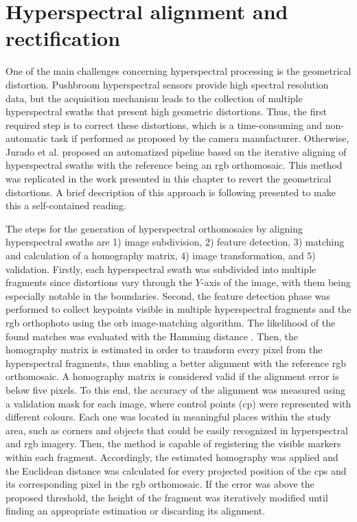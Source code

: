 \section{Hyperspectral alignment and rectification}

One of the main challenges concerning hyperspectral processing is the geometrical distortion. Pushbroom hyperspectral sensors provide high spectral resolution data, but the acquisition mechanism leads to the collection of multiple hyperspectral swaths that present high geometric distortions. Thus, the first required step is to correct these distortions, which is a time-consuming and non-automatic task if performed as proposed by the camera manufacturer. Otherwise, Jurado et al. \cite{jurado_efficient_2021} proposed an automatized pipeline based on the iterative aligning of hyperspectral swaths with the reference being an \acrshort{rgb} orthomosaic. This method was replicated in the work presented in this chapter to revert the geometrical distortions. A brief description of this approach is following presented to make this a self-contained reading.

The steps for the generation of hyperspectral orthomosaics by aligning hyperspectral swaths are 1) image subdivision, 2) feature detection, 3) matching and calculation of a homography matrix, 4) image transformation, and 5) validation. Firstly, each hyperspectral swath was subdivided into multiple fragments since distortions vary through the $Y$-axis of the image, with them being especially notable in the boundaries. Second, the feature detection phase was performed to collect keypoints visible in multiple hyperspectral fragments and the \acrshort{rgb} orthophoto using the \acrshort{orb} image-matching algorithm. The likelihood of the found matches was evaluated with the Hamming distance \cite{norouzi_hamming_2012}. Then, the homography matrix is estimated in order to transform every pixel from the hyperspectral fragments, thus enabling a better alignment with the reference \acrshort{rgb} orthomosaic. A homography matrix is considered valid if the alignment error is below five pixels. To this end, the accuracy of the alignment was measured using a validation mask for each image, where control points (\acrshort{cp}) were represented with different colours. Each one was located in meaningful places within the study area, such as corners and objects that could be easily recognized in hyperspectral and \acrshort{rgb} imagery. Then, the method is capable of registering the visible markers within each fragment. Accordingly, the estimated homography was applied and the Euclidean distance was calculated for every projected position of the \acrshort{cp}s and its corresponding pixel in the \acrshort{rgb} orthomosaic. If the error was above the proposed threshold, the height of the fragment was iteratively modified until finding an appropriate estimation or discarding its alignment.

